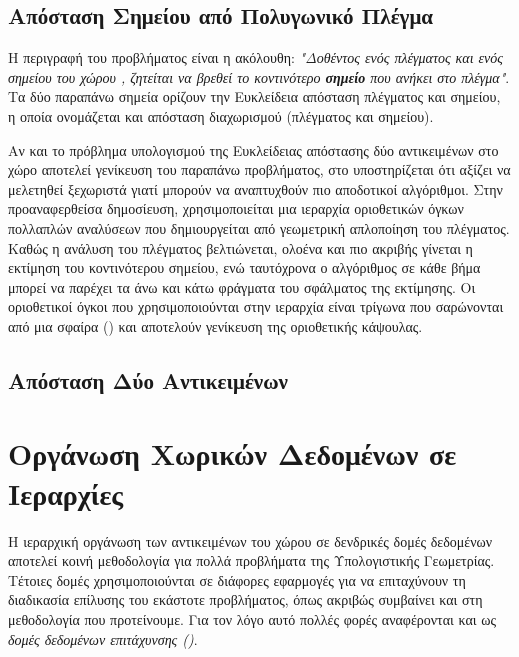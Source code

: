 
\subsection{Απόσταση Σημείου από Πολυγωνικό Πλέγμα}
Η περιγραφή του προβλήματος είναι η ακόλουθη: 
\textit{"Δοθέντος ενός πλέγματος και ενός σημείου του χώρου ,
ζητείται να βρεθεί το κοντινότερο \textbf{σημείο} που ανήκει 
στο πλέγμα"}.
Τα δύο παραπάνω σημεία ορίζουν την Ευκλείδεια απόσταση πλέγματος και σημείου, 
η οποία ονομάζεται και απόσταση διαχωρισμού (πλέγματος και σημείου).

Αν και το πρόβλημα υπολογισμού της Ευκλείδειας απόστασης δύο αντικειμένων 
στο χώρο αποτελεί γενίκευση του παραπάνω προβλήματος, στο 
\cite{guezlec2001meshsweeper} υποστηρίζεται ότι αξίζει να μελετηθεί 
ξεχωριστά γιατί μπορούν να αναπτυχθούν πιο αποδοτικοί αλγόριθμοι.
Στην προαναφερθείσα δημοσίευση, χρησιμοποιείται μια ιεραρχία οριοθετικών 
όγκων πολλαπλών αναλύσεων που δημιουργείται από γεωμετρική απλοποίηση 
του πλέγματος. 
Καθώς η ανάλυση του πλέγματος βελτιώνεται, ολοένα και πιο ακριβής γίνεται 
η εκτίμηση του κοντινότερου σημείου, ενώ ταυτόχρονα ο αλγόριθμος σε κάθε βήμα 
μπορεί να παρέχει τα άνω και κάτω φράγματα του σφάλματος της εκτίμησης.
Οι οριοθετικοί όγκοι που χρησιμοποιούνται στην ιεραρχία είναι τρίγωνα 
που σαρώνονται από μια σφαίρα () και 
αποτελούν γενίκευση της οριοθετικής κάψουλας. 
  
\subsection{Απόσταση Δύο Αντικειμένων}

\section{Οργάνωση Χωρικών Δεδομένων σε Ιεραρχίες}
Η ιεραρχική οργάνωση των αντικειμένων του χώρου σε δενδρικές 
δομές δεδομένων αποτελεί κοινή μεθοδολογία για πολλά προβλήματα 
της Υπολογιστικής Γεωμετρίας. 
Τέτοιες δομές χρησιμοποιούνται σε διάφορες εφαρμογές για να 
επιταχύνουν τη διαδικασία επίλυσης του εκάστοτε προβλήματος, 
όπως ακριβώς συμβαίνει και στη μεθοδολογία που προτείνουμε. 
Για τον λόγο αυτό πολλές φορές αναφέρονται και ως \textit{δομές 
δεδομένων επιτάχυνσης ()}.

